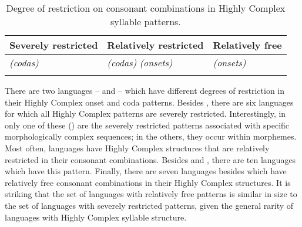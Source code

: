 \begin{table}
\begin{tabularx}{\textwidth}{QQQ}
\lsptoprule
{Severely restricted} & {Relatively restricted}  & {Relatively free}\\\midrule
{}\newline
{}\newline
{}\newline
{}\newline
{}\newline
{} \textit{(codas)}\newline
{} \newline
& \newline
{}\newline
{}\newline
{}\newline
{}\newline
{}\newline
{}\newline
{} \textit{(codas)}\newline
{} \textit{(onsets)}\newline
{}\newline
{}\newline
{}
& \newline
{}\newline
{}\newline
{} \textit{(onsets)}\newline
{}\newline
{}\newline
{}\newline
{}\\
\lspbottomrule
\end{tabularx}
\caption{\label{tab:3.13}Degree of restriction on consonant combinations in Highly Complex syllable patterns.}
\end{table}

  There are two languages --  and  -- which have different degrees of restriction in their Highly Complex onset and coda patterns. Besides , there are six languages for which all Highly Complex patterns are severely restricted. Interestingly, in only one of these () are the severely restricted patterns associated with specific morphologically complex sequences; in the others, they occur within morphemes. Most often, languages have Highly Complex structures that are relatively restricted in their consonant combinations. Besides  and , there are ten languages which have this pattern. Finally, there are seven languages besides  which have relatively free consonant combinations in their Highly Complex structures. It is striking that the set of languages with relatively free patterns is similar in size to the set of languages with severely restricted patterns, given the general rarity of languages with Highly Complex syllable structure.

